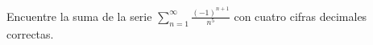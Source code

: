 \item Encuentre la suma de la serie $\displaystyle\sum_{n=1}^\infty \frac{(-1)^{n+1}}{n^5}$ con cuatro cifras decimales correctas.

